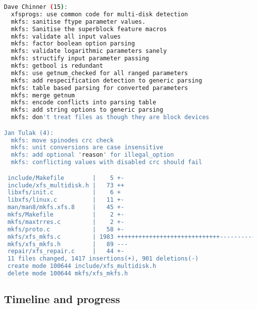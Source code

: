 \begin{lstlisting}[frame=none, basicstyle=\footnotesize\ttfamily,
language=Bash, numbers=none, numberstyle=\tiny\color{black},caption= {Git
statistics for the first patchset~\cite{finalPatchset1}. Note: Git
attributes changes only to the first author of each commit.},
label={lst:refactoring:initialcodebase}]
Dave Chinner (15):
  xfsprogs: use common code for multi-disk detection
  mkfs: sanitise ftype parameter values.
  mkfs: Sanitise the superblock feature macros
  mkfs: validate all input values
  mkfs: factor boolean option parsing
  mkfs: validate logarithmic parameters sanely
  mkfs: structify input parameter passing
  mkfs: getbool is redundant
  mkfs: use getnum_checked for all ranged parameters
  mkfs: add respecification detection to generic parsing
  mkfs: table based parsing for converted parameters
  mkfs: merge getnum
  mkfs: encode conflicts into parsing table
  mkfs: add string options to generic parsing
  mkfs: don't treat files as though they are block devices

Jan Tulak (4):
  mkfs: move spinodes crc check
  mkfs: unit conversions are case insensitive
  mkfs: add optional 'reason' for illegal_option
  mkfs: conflicting values with disabled crc should fail

 include/Makefile        |    5 +-
 include/xfs_multidisk.h |   73 ++
 libxfs/init.c           |    6 +
 libxfs/linux.c          |   11 +-
 man/man8/mkfs.xfs.8     |   45 +-
 mkfs/Makefile           |    2 +-
 mkfs/maxtrres.c         |    2 +-
 mkfs/proto.c            |   58 +-
 mkfs/xfs_mkfs.c         | 1983 +++++++++++++++++++++++++++++------------------
 mkfs/xfs_mkfs.h         |   89 ---
 repair/xfs_repair.c     |   44 +-
 11 files changed, 1417 insertions(+), 901 deletions(-)
 create mode 100644 include/xfs_multidisk.h
 delete mode 100644 mkfs/xfs_mkfs.h
\end{lstlisting}

\subsection{Timeline and progress}

